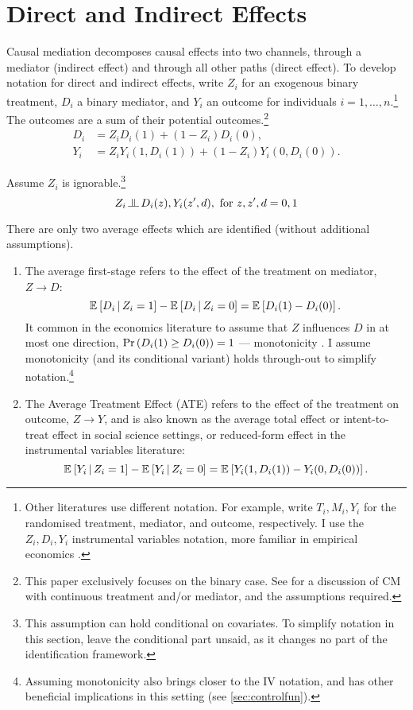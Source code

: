 \section{Direct and Indirect Effects}
\label{sec:mediation}
Causal mediation decomposes causal effects into two channels, through a mediator (indirect effect) and through all other paths (direct effect).
To develop notation for direct and indirect effects, write $Z_i$ for an exogenous binary treatment, $D_i$ a binary mediator, and $Y_i$ an outcome for individuals $i = 1, \hdots, n$.\footnote{
    Other literatures use different notation.
    For example, \cite{imai2010identification} write $T_i, M_i, Y_i$ for the randomised treatment, mediator, and outcome, respectively.
    I use the $Z_i, D_i, Y_i$ instrumental variables notation, more familiar in empirical economics \citep{angrist1996identification}.
}
The outcomes are a sum of their potential outcomes.\footnote{
    This paper exclusively focuses on the binary case.
    See \cite{huber2020direct} for a discussion of CM with continuous treatment and/or mediator, and the assumptions required.
}
\begin{align*}
    D_i &= Z_i       D_i(1)
        + (1 - Z_i) D_i(0),  \\
    Y_i &= Z_i       Y_i(1, D_i(1))
        + (1 - Z_i) Y_i(0, D_i(0)).
\end{align*}

Assume $Z_i$ is ignorable.\footnote{
    This assumption can hold conditional on covariates.
    To simplify notation in this section, leave the conditional part unsaid, as it changes no part of the identification framework.
}
\[ Z_i \indep  D_i(z), Y_i(z', d), \text{ for } z, z', d = 0, 1 \]

There are only two average effects which are identified (without additional assumptions).
\begin{enumerate}
    \item The average first-stage refers to the effect of the treatment on mediator, $Z \to D$:
    \[ \mathbb{E}_{} \left[ D_i \, \middle\vert \, Z_i = 1 \right] - \mathbb{E}_{} \left[ D_i \, \middle\vert \, Z_i = 0 \right]
        = \mathbb{E}_{} \left[ D_i(1) - D_i(0) \right]. \]
    It common in the economics literature to assume that $Z$ influences $D$ in at most one direction, $\Pr\left( D_i(1) \geq D_i(0) \right) = 1$ --- monotonicity \citep{imbens1994identification}.
    I assume monotonicity (and its conditional variant) holds through-out to simplify notation.\footnote{
        Assuming monotonicity also brings closer to the IV notation, and has other beneficial implications in this setting (see \autoref{sec:controlfun}).
    }
    \item The Average Treatment Effect (ATE) refers to the effect of the treatment on outcome, $Z \to Y$, and is also known as the average total effect or intent-to-treat effect in social science settings, or reduced-form effect in the instrumental variables literature:
    \[ \mathbb{E}_{} \left[ Y_i \, \middle\vert \, Z_i = 1 \right] - \mathbb{E}_{} \left[ Y_i \, \middle\vert \, Z_i = 0 \right]
        = \mathbb{E}_{} \left[ Y_i(1, D_i(1)) - Y_i(0, D_i(0)) \right]. \]
\end{enumerate}

